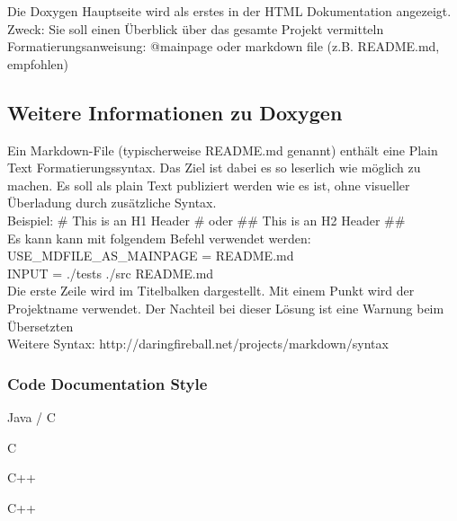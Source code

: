 Die Doxygen Hauptseite wird als erstes in der HTML Dokumentation angezeigt. \\
Zweck: Sie soll einen Überblick über das gesamte Projekt vermitteln \\
Formatierungsanweisung:  @mainpage oder markdown file (z.B. README.md, empfohlen)

\subsection{Weitere Informationen zu Doxygen}
Ein Markdown-File (typischerweise README.md genannt) enthält eine Plain Text Formatierungssyntax. Das Ziel ist dabei es so leserlich wie möglich zu machen. Es soll als plain Text publiziert werden wie es ist, ohne visueller Überladung durch zusätzliche Syntax. \\
Beispiel: \# This is an H1 Header \# oder \#\# This is an H2 Header \#\# \\
Es kann kann mit folgendem Befehl verwendet werden: USE\_MDFILE\_AS\_MAINPAGE = README.md \\
INPUT = ./tests ./src README.md  \\
Die erste Zeile wird im Titelbalken dargestellt. Mit einem Punkt wird der Projektname verwendet. Der Nachteil bei dieser Lösung ist eine Warnung beim Übersetzten \\
Weitere Syntax: http://daringfireball.net/projects/markdown/syntax \\

\subsubsection{Code Documentation Style}

\begin{minipage}{8cm}
 Java / C 
\end{minipage}
\begin{minipage}{3cm}
	C
\end{minipage}
\begin{minipage}{3cm}
	C++
\end{minipage}
\begin{minipage}{3cm}
	C++
\end{minipage}

